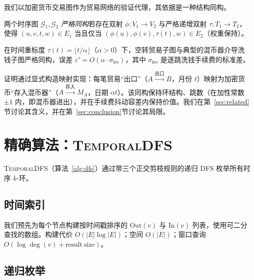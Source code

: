 \documentclass[journal,onecolumn]{IEEEtran}
\newcommand{\G}{\mathcal{G}}
\newcommand{\eps}{\varepsilon}
\begin{document}
我们以加密货币交易图作为贸易网络的验证代理，其依据是一种结构同构。

\begin{definition}[严格结构同构]
\label{def:iso}
两个时序图 $\G_1, \G_2$ \emph{严格同构}若存在双射 $\phi: V_1 \to V_2$ 与严格递增双射 $\tau: T_1 \to T_2$，使得 $(u, v, t, w) \in E_1$ 当且仅当 $(\phi(u), \phi(v), \tau(t), w) \in E_2$（权重保持）。
\end{definition}

\begin{theorem}
\label{thm:iso}
在时间重标度 $\tau(t) = \lfloor t / \alpha \rfloor$（$\alpha > 0$）下，空转贸易子图与典型的混币器介导洗钱子图严格同构，误差 $\eps' = O(\alpha \cdot \sigma_{\mathrm{fee}})$，其中 $\sigma_{\mathrm{fee}}$ 是逐跳洗钱手续费的标准差。
\end{theorem}

证明通过显式构造映射实现：每笔贸易``出口''（$A \xrightarrow{\mathrm{出口}} B$，月份 $t$）映射为加密货币``存入混币器''（$A \xrightarrow{\mathrm{存入}} M_A$，日期 $\alpha t$）。该同构保持环结构、跳数（在加性常数 $\pm 1$ 内，即混币器进出），并在手续费抖动容差内保持价值。我们在第~\ref{sec:related}节讨论其含义，并在第~\ref{sec:conclusion}节讨论其局限。

\section{精确算法：\textsc{TemporalDFS}}
\label{sec:exact}

\textsc{TemporalDFS}（算法~\ref{alg:dfs}）通过带三个正交剪枝规则的递归 DFS 枚举所有时序 $k$-环。

\subsection{时间索引}
\label{sec:exact-index}

我们预先为每个节点构建按时间戳排序的 $\mathrm{Out}(v)$ 与 $\mathrm{In}(v)$ 列表，使用可二分查找的数组。构建代价 $O(|E| \log |E|)$；空间 $O(|E|)$；窗口查询 $O(\log \deg(v) + \mathrm{result\ size})$。

\subsection{递归枚举}
\label{sec:exact-rec}
\end{document}
